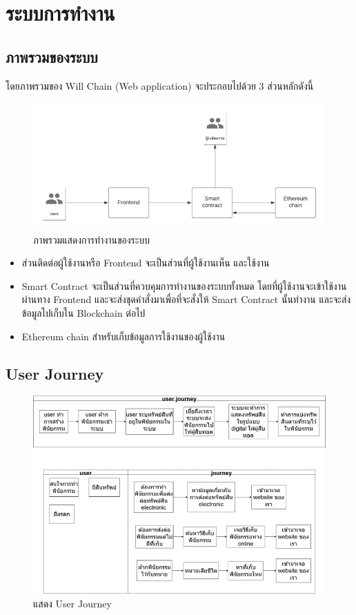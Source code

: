 \documentclass[12pt,oneside,openright,a4paper]{cpe-thai-project}
\begin{document}
\section{ระบบการทำงาน}
\subsection{ภาพรวมของระบบ}
\tab โดยภาพรวมของ Will Chain (Web application) จะประกอบไปด้วย 3 ส่วนหลักดังนี้
	\begin{figure}[h]
		\centering
		\includegraphics[scale=0.8]{Overall_system}
		\caption{ภาพรวมแสดงการทำงานของระบบ}
	\end{figure}
	\begin{itemize}[leftmargin=0pt,itemindent=2.5cm]
		\item ส่วนติดต่อผู้ใช้งานหรือ Frontend จะเป็นส่วนที่ผู้ใช้งานเห็น และใช้งาน
		\item Smart Contract จะเป็นส่วนที่ควบคุมการทำงานของระบบทั้งหมด โดยที่ผู้ใช้งานจะเข้าใช้งานผ่านทาง Frontend และจะส่งชุดคำสั่งมาเพื่อที่จะสั่งให้ Smart Contract นั้นทำงาน และจะส่งข้อมูลไปเก็บใน Blockchain ต่อไป
		\item Ethereum chain สำหรับเก็บข้อมูลการใช้งานของผู้ใช้งาน
	\end{itemize}

\subsection{User Journey}
	\begin{figure}[h]
		\centering
		\includegraphics[scale=0.8]{UserJourney}
		\caption{แสดง User Journey}
	\end{figure}
\FloatBarrier
\hfill\\
\hfill\\
\hfill\\
\end{document}
